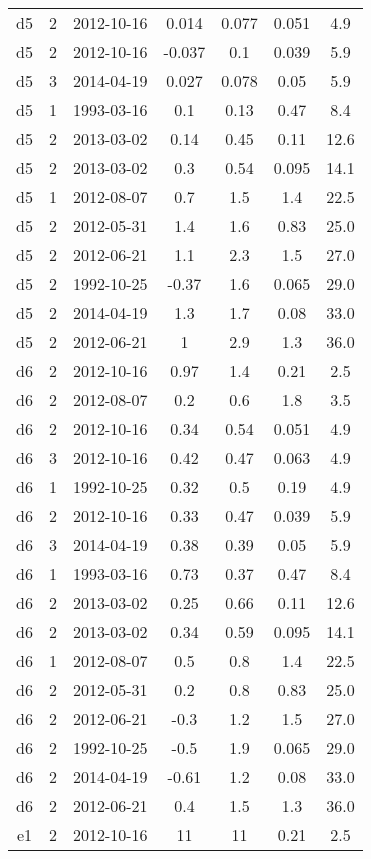 \begin{table*}[htp]
\begin{tabular}{ccccccc}
d5 & 2 & 2012-10-16 & 0.014 & 0.077 & 0.051 & 4.9 \\
d5 & 2 & 2012-10-16 & -0.037 & 0.1 & 0.039 & 5.9 \\
d5 & 3 & 2014-04-19 & 0.027 & 0.078 & 0.05 & 5.9 \\
d5 & 1 & 1993-03-16 & 0.1 & 0.13 & 0.47 & 8.4 \\
d5 & 2 & 2013-03-02 & 0.14 & 0.45 & 0.11 & 12.6 \\
d5 & 2 & 2013-03-02 & 0.3 & 0.54 & 0.095 & 14.1 \\
d5 & 1 & 2012-08-07 & 0.7 & 1.5 & 1.4 & 22.5 \\
d5 & 2 & 2012-05-31 & 1.4 & 1.6 & 0.83 & 25.0 \\
d5 & 2 & 2012-06-21 & 1.1 & 2.3 & 1.5 & 27.0 \\
d5 & 2 & 1992-10-25 & -0.37 & 1.6 & 0.065 & 29.0 \\
d5 & 2 & 2014-04-19 & 1.3 & 1.7 & 0.08 & 33.0 \\
d5 & 2 & 2012-06-21 & 1 & 2.9 & 1.3 & 36.0 \\
d6 & 2 & 2012-10-16 & 0.97 & 1.4 & 0.21 & 2.5 \\
d6 & 2 & 2012-08-07 & 0.2 & 0.6 & 1.8 & 3.5 \\
d6 & 2 & 2012-10-16 & 0.34 & 0.54 & 0.051 & 4.9 \\
d6 & 3 & 2012-10-16 & 0.42 & 0.47 & 0.063 & 4.9 \\
d6 & 1 & 1992-10-25 & 0.32 & 0.5 & 0.19 & 4.9 \\
d6 & 2 & 2012-10-16 & 0.33 & 0.47 & 0.039 & 5.9 \\
d6 & 3 & 2014-04-19 & 0.38 & 0.39 & 0.05 & 5.9 \\
d6 & 1 & 1993-03-16 & 0.73 & 0.37 & 0.47 & 8.4 \\
d6 & 2 & 2013-03-02 & 0.25 & 0.66 & 0.11 & 12.6 \\
d6 & 2 & 2013-03-02 & 0.34 & 0.59 & 0.095 & 14.1 \\
d6 & 1 & 2012-08-07 & 0.5 & 0.8 & 1.4 & 22.5 \\
d6 & 2 & 2012-05-31 & 0.2 & 0.8 & 0.83 & 25.0 \\
d6 & 2 & 2012-06-21 & -0.3 & 1.2 & 1.5 & 27.0 \\
d6 & 2 & 1992-10-25 & -0.5 & 1.9 & 0.065 & 29.0 \\
d6 & 2 & 2014-04-19 & -0.61 & 1.2 & 0.08 & 33.0 \\
d6 & 2 & 2012-06-21 & 0.4 & 1.5 & 1.3 & 36.0 \\
e1 & 2 & 2012-10-16 & 11 & 11 & 0.21 & 2.5 \\

\end{tabular}
\end{table*}
